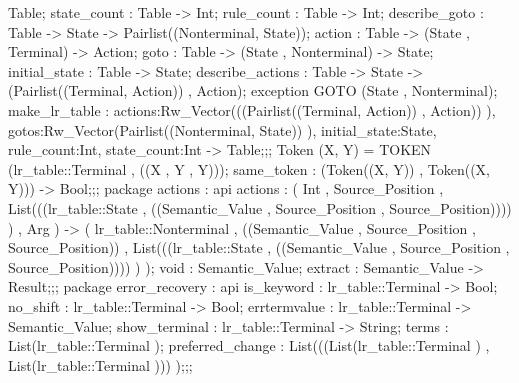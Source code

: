 {{{{                                        Table;
                                        state_count : Table -> Int;
                                        rule_count : Table -> Int;
                                        describe_goto : Table -> State -> Pairlist((Nonterminal, State));
                                        action : Table -> (State , Terminal) -> Action;
                                        goto : Table -> (State , Nonterminal) -> State;
                                        initial_state : Table -> State;
                                        describe_actions : Table -> State -> (Pairlist((Terminal, Action)) , Action);
                                        exception GOTO (State , Nonterminal);
                                            make_lr_table :
                                                    {actions:Rw_Vector(((Pairlist((Terminal, Action)) , Action)) ),
                                                    gotos:Rw_Vector(Pairlist((Nonterminal, State)) ), initial_state:State, rule_count:Int,
                                                    state_count:Int}
                                                ->
                                                Table;};;
                            Token (X, Y) = TOKEN (lr_table::Terminal , ((X , Y , Y)));
                            same_token : (Token((X, Y)) , Token((X, Y))) -> Bool;};;
                    package actions
                      : api {   actions :
                                    (   Int , Source_Position ,
                                        List(((lr_table::State , ((Semantic_Value , Source_Position , Source_Position)))) ) , Arg
                                    )
                                    ->
                                    (   lr_table::Nonterminal , ((Semantic_Value , Source_Position , Source_Position)) ,
                                        List(((lr_table::State , ((Semantic_Value , Source_Position , Source_Position)))) )
                                    );
                            void : Semantic_Value;
                            extract : Semantic_Value -> Result;};;
                    package error_recovery
                      : api {
                            is_keyword : lr_table::Terminal -> Bool;
                            no_shift : lr_table::Terminal -> Bool;
                            errtermvalue : lr_table::Terminal -> Semantic_Value;
                            show_terminal : lr_table::Terminal -> String;
                            terms : List(lr_table::Terminal );
                            preferred_change : List(((List(lr_table::Terminal ) , List(lr_table::Terminal ))) );};;
}}
